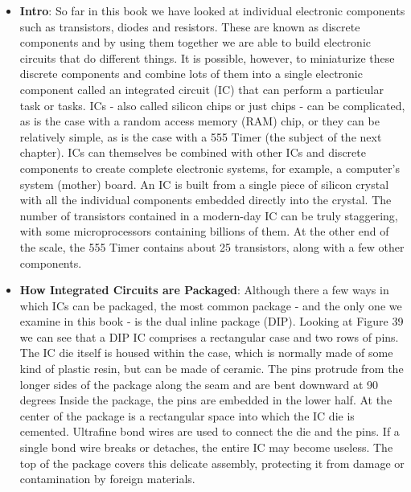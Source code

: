 \documentclass{report}
\begin{document}
    \pagebreak 
    \begin{itemize}
        \item \textbf{Intro}: So far in this book we have looked at individual electronic components such as transistors, diodes and resistors. These are known as discrete components and by using them together we are able to build electronic circuits that do different things. It is possible, however, to miniaturize these discrete components and combine lots of them into a single electronic component called an integrated circuit (IC) that can perform a particular task or tasks. ICs - also called silicon chips or just chips - can be complicated, as is the case with a random access memory (RAM) chip, or they can be relatively simple, as is the case with a 555 Timer (the subject of the next chapter). ICs can themselves be combined with other ICs and discrete components to create complete electronic systems, for example, a computer's system (mother) board.
            \bigbreak \noindent 
            An IC is built from a single piece of silicon crystal with all the individual components embedded directly into the crystal. The number of transistors contained in a modern-day IC can be truly staggering, with some microprocessors containing billions of them. At the other end of the scale, the 555 Timer contains about 25 transistors, along with a few other components.
        \item \textbf{How Integrated Circuits are Packaged}: Although there a few ways in which ICs can be packaged, the most common package - and the only one we examine in this book - is the dual inline package (DIP).
            \bigbreak \noindent 
            \bigbreak \noindent 
            Looking at Figure 39 we can see that a DIP IC comprises a rectangular case and two rows of pins. The IC die itself is housed within the case, which is normally made of some kind of plastic resin, but can be made of ceramic.
            \bigbreak \noindent 
            The pins protrude from the longer sides of the package along the seam and are bent downward at 90 degrees
            \bigbreak \noindent 
            \bigbreak \noindent 
            Inside the package, the pins are embedded in the lower half. At the center of the package is a rectangular space into which the IC die is cemented. Ultrafine bond wires are used to connect the die and the pins. If a single bond wire breaks or detaches, the entire IC may become useless. The top of the package covers this delicate assembly, protecting it from damage or contamination by foreign materials.

\end{itemize}
\end{document}

